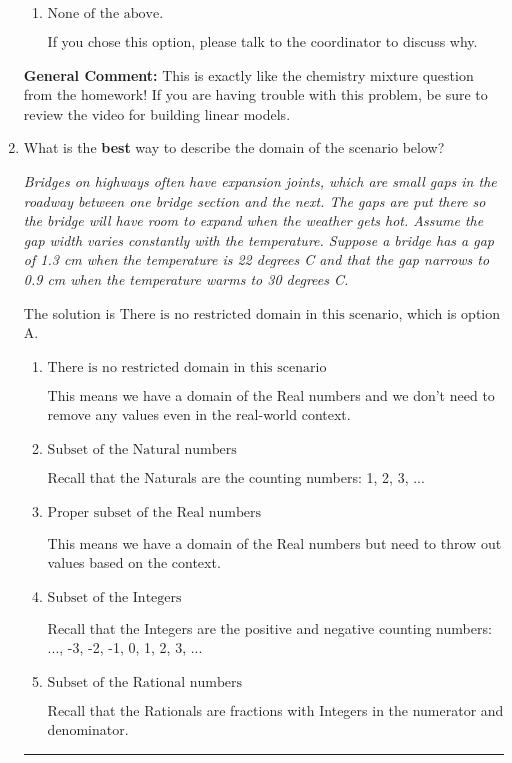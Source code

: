 \documentclass{extbook}[14pt]
\newcommand{\litem}[1]{\item #1

\rule{\textwidth}{0.4pt}}
\begin{document}
\begin{enumerate}
{\begin{enumerate}[label=\Alph*.]
This models the cost of the high-quality bean only, not the blended beans.
\item \( \text{None of the above.} \)

If you chose this option, please talk to the coordinator to discuss why.
\end{enumerate}

\textbf{General Comment:} This is exactly like the chemistry mixture question from the homework! If you are having trouble with this problem, be sure to review the video for building linear models.
}
\litem{
What is the \textbf{best} way to describe the domain of the scenario below?

\begin{center}
    \textit{ Bridges on highways often have expansion joints, which are small gaps in the roadway between one bridge section and the next. The gaps are put there so the bridge will have room to expand when the weather gets hot. Assume the gap width varies constantly with the temperature. Suppose a bridge has a gap of 1.3 cm when the temperature is 22 degrees C and that the gap narrows to 0.9 cm when the temperature warms to 30 degrees C. }
\end{center}
The solution is \( \text{There is no restricted domain in this scenario} \), which is option A.\begin{enumerate}[label=\Alph*.]
\item \( \text{There is no restricted domain in this scenario} \)

This means we have a domain of the Real numbers and we don't need to remove any values even in the real-world context.
\item \( \text{Subset of the Natural numbers} \)

Recall that the Naturals are the counting numbers: 1, 2, 3, ...
\item \( \text{Proper subset of the Real numbers} \)

This means we have a domain of the Real numbers but need to throw out values based on the context.
\item \( \text{Subset of the Integers} \)

Recall that the Integers are the positive and negative counting numbers: ..., -3, -2, -1, 0, 1, 2, 3, ... 
\item \( \text{Subset of the Rational numbers} \)

Recall that the Rationals are fractions with Integers in the numerator and denominator.
\end{enumerate}

}
\end{enumerate}
\end{document}
